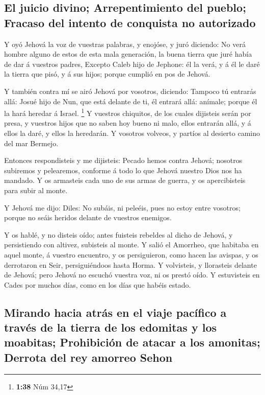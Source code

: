 \hypertarget{el-juicio-divino-arrepentimiento-del-pueblo-fracaso-del-intento-de-conquista-no-autorizado}{%
\subsection{El juicio divino; Arrepentimiento del pueblo; Fracaso del
intento de conquista no
autorizado}\label{el-juicio-divino-arrepentimiento-del-pueblo-fracaso-del-intento-de-conquista-no-autorizado}}

 Y oyó Jehová la voz de vuestras palabras, y enojóse, y
juró diciendo:  No verá hombre alguno de estos de esta mala
generación, la buena tierra que juré había de dar á vuestros padres,
 Excepto Caleb hijo de Jephone: él la verá, y á él le daré
la tierra que pisó, y á sus hijos; porque cumplió en pos de Jehová.

 Y también contra mí se airó Jehová por vosotros, diciendo:
Tampoco tú entrarás allá:  Josué hijo de Nun, que está
delante de ti, él entrará allá: anímale; porque él la hará heredar á
Israel. \footnote{\textbf{1:38} Núm 34,17}  Y vuestros
chiquitos, de los cuales dijisteis serán por presa, y vuestros hijos que
no saben hoy bueno ni malo, ellos entrarán allá, y á ellos la daré, y
ellos la heredarán.  Y vosotros volveos, y partíos al
desierto camino del mar Bermejo.

 Entonces respondisteis y me dijisteis: Pecado hemos contra
Jehová; nosotros subiremos y pelearemos, conforme á todo lo que Jehová
nuestro Dios nos ha mandado. Y os armasteis cada uno de sus armas de
guerra, y os apercibisteis para subir al monte.

 Y Jehová me dijo: Diles: No subáis, ni peleéis, pues no
estoy entre vosotros; porque no seáis heridos delante de vuestros
enemigos.

 Y os hablé, y no disteis oído; antes fuisteis rebeldes al
dicho de Jehová, y persistiendo con altivez, subisteis al monte.
 Y salió el Amorrheo, que habitaba en aquel monte, á
vuestro encuentro, y os persiguieron, como hacen las avispas, y os
derrotaron en Seir, persiguiéndoos hasta Horma.  Y
volvisteis, y llorasteis delante de Jehová; pero Jehová no escuchó
vuestra voz, ni os prestó oído.  Y estuvisteis en Cades por
muchos días, como en los días que habéis estado.

\hypertarget{mirando-hacia-atruxe1s-en-el-viaje-pacuxedfico-a-travuxe9s-de-la-tierra-de-los-edomitas-y-los-moabitas-prohibiciuxf3n-de-atacar-a-los-amonitas-derrota-del-rey-amorreo-sehon}{%
\subsection{Mirando hacia atrás en el viaje pacífico a través de la
tierra de los edomitas y los moabitas; Prohibición de atacar a los
amonitas; Derrota del rey amorreo
Sehon}\label{mirando-hacia-atruxe1s-en-el-viaje-pacuxedfico-a-travuxe9s-de-la-tierra-de-los-edomitas-y-los-moabitas-prohibiciuxf3n-de-atacar-a-los-amonitas-derrota-del-rey-amorreo-sehon}}

